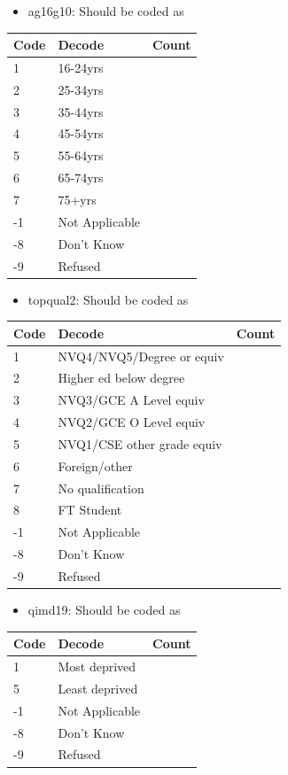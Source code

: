 \documentclass[
  11pt,
]{article}
\providecommand{\tightlist}{%
  \setlength{\itemsep}{0pt}\setlength{\parskip}{0pt}}
\begin{document}
\begin{itemize}
\tightlist
\item
  ag16g10: Should be coded as
\end{itemize}

\begin{longtable}[]{@{}lll@{}}
\toprule()
Code & Decode & Count \\
\midrule()
\endhead
1 & 16-24yrs & \\
2 & 25-34yrs & \\
3 & 35-44yrs & \\
4 & 45-54yrs & \\
5 & 55-64yrs & \\
6 & 65-74yrs & \\
7 & 75+yrs & \\
-1 & Not Applicable & \\
-8 & Don't Know & \\
-9 & Refused & \\
\bottomrule()
\end{longtable}

\begin{itemize}
\tightlist
\item
  topqual2: Should be coded as
\end{itemize}

\begin{longtable}[]{@{}lll@{}}
\toprule()
Code & Decode & Count \\
\midrule()
\endhead
1 & NVQ4/NVQ5/Degree or equiv & \\
2 & Higher ed below degree & \\
3 & NVQ3/GCE A Level equiv & \\
4 & NVQ2/GCE O Level equiv & \\
5 & NVQ1/CSE other grade equiv & \\
6 & Foreign/other & \\
7 & No qualification & \\
8 & FT Student & \\
-1 & Not Applicable & \\
-8 & Don't Know & \\
-9 & Refused & \\
\bottomrule()
\end{longtable}

\begin{itemize}
\tightlist
\item
  qimd19: Should be coded as
\end{itemize}

\begin{longtable}[]{@{}lll@{}}
\toprule()
Code & Decode & Count \\
\midrule()
\endhead
1 & Most deprived & \\
5 & Least deprived & \\
-1 & Not Applicable & \\
-8 & Don't Know & \\
-9 & Refused & \\
\bottomrule()
\end{longtable}
\end{document}
